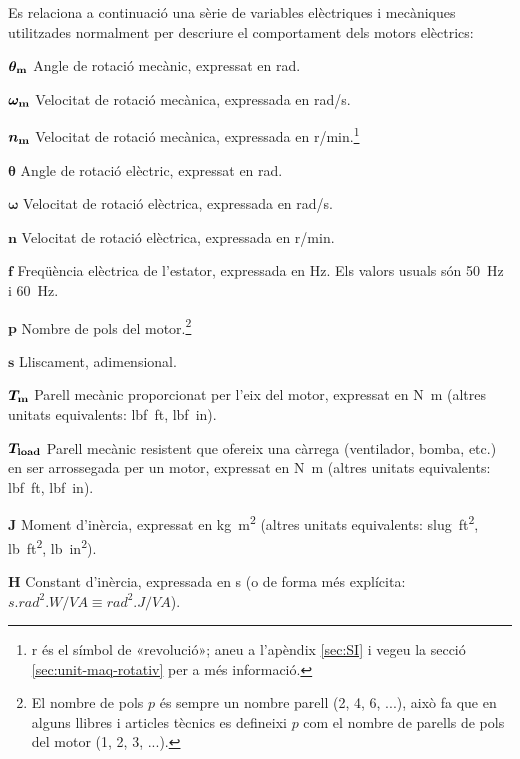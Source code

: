 Es relaciona a continuació una sèrie de variables elèctriques i mecàniques utilitzades normalment per descriure el comportament dels motors elèctrics:

\begin{list}{}
   {\setlength{\labelwidth}{12mm} \setlength{\leftmargin}{12mm} \setlength{\labelsep}{2mm}}
   \item[$\boldsymbol{\theta_\mathrm{m}}$] Angle de rotació mecànic, expressat en \si{rad}.
   \item[$\boldsymbol{\omega_\mathrm{m}}$] Velocitat de rotació mecànica, expressada en \si{rad/s}.
   \item[$\boldsymbol{n_\mathrm{m}}$] Velocitat de rotació mecànica, expressada en \si{r/min}.\footnote{r és el símbol de «revolució»; aneu a l'apèndix \ref{sec:SI} i vegeu la secció \ref{sec:unit-maq-rotativ} per a més informació.}
   \item[$\boldsymbol{\theta}$] Angle de rotació elèctric, expressat en \si{rad}.
   \item[$\boldsymbol{\omega}$] Velocitat de rotació elèctrica, expressada en \si{rad/s}.
   \item[$\boldsymbol{n}$] Velocitat de rotació elèctrica, expressada en \si{r/min}.
   \item[$\boldsymbol{f}$] Freqüència elèctrica de l'estator, expressada en \si{Hz}. Els valors usuals són \SI{50}{Hz} i \SI{60}{Hz}.
   \item[$\boldsymbol{p}$] Nombre de pols del motor.\footnote{El nombre de pols $p$  és sempre un nombre parell (2, 4, 6, ...), això fa que en alguns llibres i articles tècnics es defineixi $p$ com el nombre de parells de pols del motor       (1, 2, 3, ...).}
   \item[$\boldsymbol{s}$] Lliscament, adimensional.
   \item[$\boldsymbol{T_\mathrm{m}}$] Parell mecànic proporcionat per l'eix del motor, expressat en \si{N.m} (altres unitats equivalents: \si{lbf.ft}, \si{lbf.in}).
   \item[$\boldsymbol{T_\mathrm{load}}$] Parell mecànic resistent que ofereix una càrrega (ventilador, bomba, etc.) en ser arrossegada per un motor, expressat en \si{N.m} (altres unitats equivalents: \si{lbf.ft}, \si{lbf.in}).
   \item[$\boldsymbol{J}$] Moment d'inèrcia, expressat en \si{kg.m^2} (altres unitats equivalents: \si{slug.ft^2}, \si{lb.ft^2}, \si{lb.in^2}).
   \item[$\boldsymbol{H}$] Constant d'inèrcia, expressada en \si{s} (o de forma més explícita:
   $\si{s.rad^2.W/VA} \equiv \si{rad^2.J/VA}$).

\end{list}
